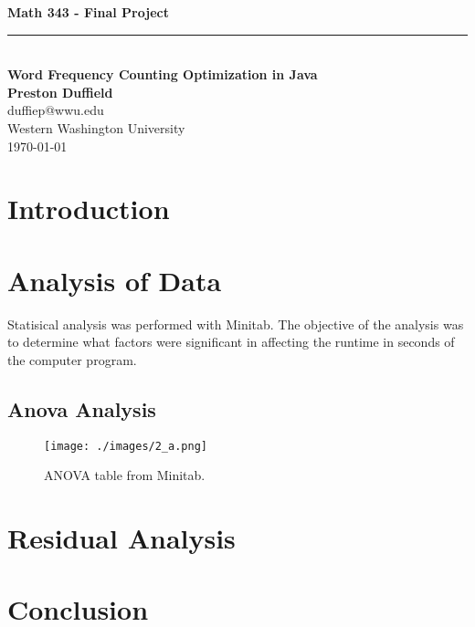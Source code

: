 \documentclass{article}
\begin{document}
\noindent

\begin{center}
    \vspace*{0.3\textheight}
    {\fontsize{80}{18}\textbf{Math 343 - Final Project}}\\
    \vspace{6pt} %
    \rule{0.87\linewidth}{1pt}\\ %
    \vspace{12pt} %
    \LARGE\textbf{Word Frequency Counting Optimization in Java}\\
    
    \vspace{12pt}
    \Large\textbf{Preston Duffield} \\
    \Large duffiep@wwu.edu \\
    \Large Western Washington University \\
    \today
    \vspace{24pt}
\end{center}

\clearpage
\section*{Introduction}



\section*{Analysis of Data}
Statisical analysis was performed with Minitab.
The objective of the analysis was to determine what factors were
significant in affecting the runtime in seconds of the computer program.

\subsection*{Anova Analysis}
\begin{figure}[h]
  \centering
  \texttt{[image: ./images/2\_a.png]}
  \caption{ANOVA table from Minitab.}
  \label{fig:2_a}
\end{figure}


\section*{Residual Analysis}
\section*{Conclusion}
\end{document}
